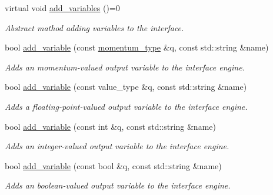 \begin{DoxyCompactItemize}
\item 
virtual void \hyperlink{a00314_a9a6ee7dc4e89ecec32603e51da802cc4}{add\-\_\-variables} ()=0
\begin{DoxyCompactList}\small\item\em Abstract mathod adding variables to the interface. \end{DoxyCompactList}\item 
\hypertarget{a00314_a7500d971ef67d2045a64fdb9429a810c}{bool \hyperlink{a00314_a7500d971ef67d2045a64fdb9429a810c}{add\-\_\-variable} (const \hyperlink{a00559}{momentum\-\_\-type} \&q, const std\-::string \&name)}\label{a00314_a7500d971ef67d2045a64fdb9429a810c}

\begin{DoxyCompactList}\small\item\em Adds an momentum-\/valued output variable to the interface engine. \end{DoxyCompactList}\item 
\hypertarget{a00314_aca7d353daee5721c27a6e33571366a34}{bool \hyperlink{a00314_aca7d353daee5721c27a6e33571366a34}{add\-\_\-variable} (const value\-\_\-type \&q, const std\-::string \&name)}\label{a00314_aca7d353daee5721c27a6e33571366a34}

\begin{DoxyCompactList}\small\item\em Adds a floating-\/point-\/valued output variable to the interface engine. \end{DoxyCompactList}\item 
\hypertarget{a00314_a47a525730c8a76d72d4612ac9390a360}{bool \hyperlink{a00314_a47a525730c8a76d72d4612ac9390a360}{add\-\_\-variable} (const int \&q, const std\-::string \&name)}\label{a00314_a47a525730c8a76d72d4612ac9390a360}

\begin{DoxyCompactList}\small\item\em Adds an integer-\/valued output variable to the interface engine. \end{DoxyCompactList}\item 
\hypertarget{a00314_a83adfb42e106a738461bceb4df4d1881}{bool \hyperlink{a00314_a83adfb42e106a738461bceb4df4d1881}{add\-\_\-variable} (const bool \&q, const std\-::string \&name)}\label{a00314_a83adfb42e106a738461bceb4df4d1881}

\begin{DoxyCompactList}\small\item\em Adds an boolean-\/valued output variable to the interface engine. \end{DoxyCompactList}\end{DoxyCompactItemize}
